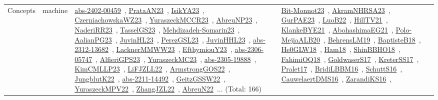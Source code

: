 {\begin{longtable}{lp{3cm}>{\raggedright\arraybackslash}p{6cm}>{\raggedright\arraybackslash}p{6cm}>{\raggedright\arraybackslash}p{8cm}}
Concepts & machine & \href{works/abs-2402-00459.pdf}{abs-2402-00459}~\cite{abs-2402-00459}, \href{works/PrataAN23.pdf}{PrataAN23}~\cite{PrataAN23}, \href{works/IsikYA23.pdf}{IsikYA23}~\cite{IsikYA23}, \href{works/CzerniachowskaWZ23.pdf}{CzerniachowskaWZ23}~\cite{CzerniachowskaWZ23}, \href{works/YuraszeckMCCR23.pdf}{YuraszeckMCCR23}~\cite{YuraszeckMCCR23}, \href{works/AbreuNP23.pdf}{AbreuNP23}~\cite{AbreuNP23}, \href{works/NaderiRR23.pdf}{NaderiRR23}~\cite{NaderiRR23}, \href{works/TasselGS23.pdf}{TasselGS23}~\cite{TasselGS23}, \href{works/Mehdizadeh-Somarin23.pdf}{Mehdizadeh-Somarin23}~\cite{Mehdizadeh-Somarin23}, \href{works/AalianPG23.pdf}{AalianPG23}~\cite{AalianPG23}, \href{works/JuvinHL23.pdf}{JuvinHL23}~\cite{JuvinHL23}, \href{works/PerezGSL23.pdf}{PerezGSL23}~\cite{PerezGSL23}, \href{works/JuvinHHL23.pdf}{JuvinHHL23}~\cite{JuvinHHL23}, \href{works/abs-2312-13682.pdf}{abs-2312-13682}~\cite{abs-2312-13682}, \href{works/LacknerMMWW23.pdf}{LacknerMMWW23}~\cite{LacknerMMWW23}, \href{works/EfthymiouY23.pdf}{EfthymiouY23}~\cite{EfthymiouY23}, \href{works/abs-2306-05747.pdf}{abs-2306-05747}~\cite{abs-2306-05747}, \href{works/AlfieriGPS23.pdf}{AlfieriGPS23}~\cite{AlfieriGPS23}, \href{works/YuraszeckMC23.pdf}{YuraszeckMC23}~\cite{YuraszeckMC23}, \href{works/abs-2305-19888.pdf}{abs-2305-19888}~\cite{abs-2305-19888}, \href{works/KimCMLLP23.pdf}{KimCMLLP23}~\cite{KimCMLLP23}, \href{works/LiFJZLL22.pdf}{LiFJZLL22}~\cite{LiFJZLL22}, \href{works/ArmstrongGOS22.pdf}{ArmstrongGOS22}~\cite{ArmstrongGOS22}, \href{works/JungblutK22.pdf}{JungblutK22}~\cite{JungblutK22}, \href{works/abs-2211-14492.pdf}{abs-2211-14492}~\cite{abs-2211-14492}, \href{works/GeitzGSSW22.pdf}{GeitzGSSW22}~\cite{GeitzGSSW22}, \href{works/YuraszeckMPV22.pdf}{YuraszeckMPV22}~\cite{YuraszeckMPV22}, \href{works/ZhangJZL22.pdf}{ZhangJZL22}~\cite{ZhangJZL22}, \href{works/AbreuN22.pdf}{AbreuN22}~\cite{AbreuN22}... (Total: 166) & \href{works/Bit-Monnot23.pdf}{Bit-Monnot23}~\cite{Bit-Monnot23}, \href{works/AkramNHRSA23.pdf}{AkramNHRSA23}~\cite{AkramNHRSA23}, \href{works/GurPAE23.pdf}{GurPAE23}~\cite{GurPAE23}, \href{works/LuoB22.pdf}{LuoB22}~\cite{LuoB22}, \href{works/HillTV21.pdf}{HillTV21}~\cite{HillTV21}, \href{works/KlankeBYE21.pdf}{KlankeBYE21}~\cite{KlankeBYE21}, \href{works/AbohashimaEG21.pdf}{AbohashimaEG21}~\cite{AbohashimaEG21}, \href{works/Polo-MejiaALB20.pdf}{Polo-MejiaALB20}~\cite{Polo-MejiaALB20}, \href{works/BehrensLM19.pdf}{BehrensLM19}~\cite{BehrensLM19}, \href{works/BaptisteB18.pdf}{BaptisteB18}~\cite{BaptisteB18}, \href{works/He0GLW18.pdf}{He0GLW18}~\cite{He0GLW18}, \href{works/Ham18.pdf}{Ham18}~\cite{Ham18}, \href{works/ShinBBHO18.pdf}{ShinBBHO18}~\cite{ShinBBHO18}, \href{works/FahimiOQ18.pdf}{FahimiOQ18}~\cite{FahimiOQ18}, \href{works/GoldwaserS17.pdf}{GoldwaserS17}~\cite{GoldwaserS17}, \href{works/KreterSS17.pdf}{KreterSS17}~\cite{KreterSS17}, \href{works/Pralet17.pdf}{Pralet17}~\cite{Pralet17}, \href{works/BridiLBBM16.pdf}{BridiLBBM16}~\cite{BridiLBBM16}, \href{works/SchuttS16.pdf}{SchuttS16}~\cite{SchuttS16}, \href{works/CauwelaertDMS16.pdf}{CauwelaertDMS16}~\cite{CauwelaertDMS16}, \href{works/ZarandiKS16.pdf}{ZarandiKS16}~\cite{ZarandiKS16}, 
\end{longtable}}
